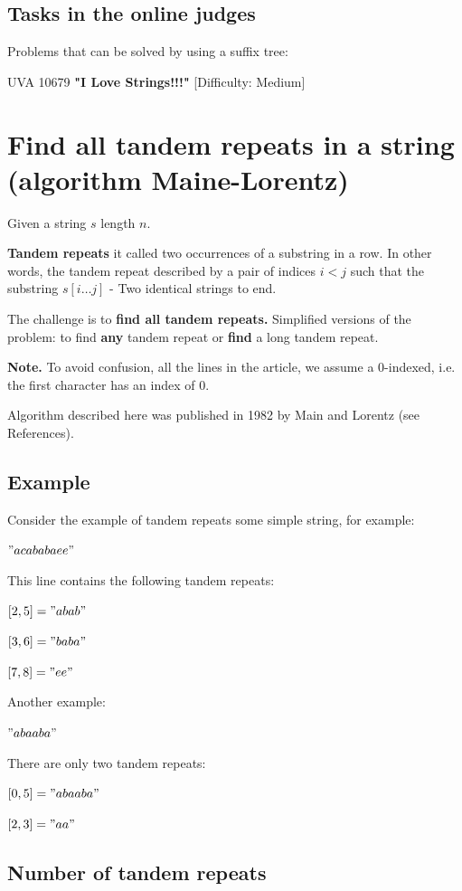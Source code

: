 \subsection{ Tasks in the online judges }

Problems that can be solved by using a suffix tree:

UVA 10679 \textbf{"I Love Strings!!!"} [Difficulty: Medium]
\section{ Find all tandem repeats in a string (algorithm Maine-Lorentz) }
Given a string $s$ length $n$.

\textbf{Tandem repeats} it called two occurrences of a substring in a row. In other words, the tandem repeat described by a pair of indices $i <j$ such that the substring $s [i \ldots j]$ - Two identical strings to end.

The challenge is to \textbf{find all tandem repeats.} Simplified versions of the problem: to find \textbf{any} tandem repeat or \textbf{find} a long tandem repeat.

\textbf{Note.} To avoid confusion, all the lines in the article, we assume a 0-indexed, i.e. the first character has an index of 0.

Algorithm described here was published in 1982 by Main and Lorentz (see References).

\subsection{ Example }

Consider the example of tandem repeats some simple string, for example:

$" acababaee" $

This line contains the following tandem repeats:

$[2, 5] =" abab"$

$[3, 6] =" baba"$

$[7, 8] =" ee"$

Another example:

$" abaaba" $

There are only two tandem repeats:

$[0, 5] =" abaaba"$

$[2, 3] =" aa"$
\subsection{ Number of tandem repeats }

